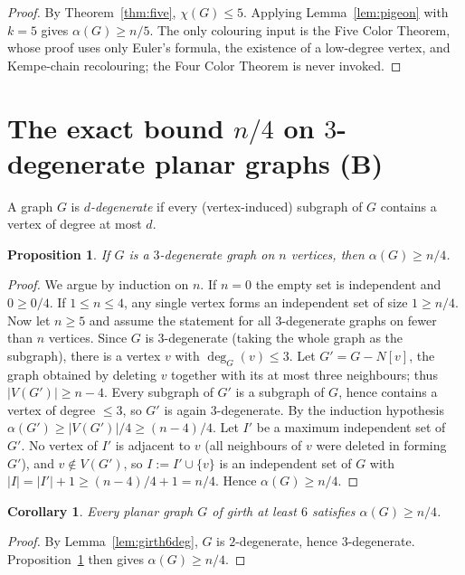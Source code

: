 \documentclass{amsart}
\newtheorem{corollary}{Corollary}
\newtheorem{proposition}{Proposition}
\theoremstyle{remark}
\begin{document}
\begin{proof}
By Theorem~\ref{thm:five}, $\chi(G)\le5$. Applying Lemma~\ref{lem:pigeon} with
$k=5$ gives $\alpha(G)\ge n/5$. The only colouring input is the Five Color
Theorem, whose proof uses only Euler's formula, the existence of a low-degree
vertex, and Kempe-chain recolouring; the Four Color Theorem is never invoked.
\end{proof}

\section{The exact bound \texorpdfstring{$n/4$}{n/4} on \texorpdfstring{$3$}{3}-degenerate
planar graphs (B)}\label{sec:3deg}

A graph $G$ is \emph{$d$-degenerate} if every (vertex-induced) subgraph of $G$
contains a vertex of degree at most $d$.

\begin{proposition}\label{prop:3deg}
If $G$ is a $3$-degenerate graph on $n$ vertices, then $\alpha(G)\ge n/4$.
\end{proposition}

\begin{proof}
We argue by induction on $n$. If $n=0$ the empty set is independent and
$0\ge 0/4$. If $1\le n\le4$, any single vertex forms an independent set of size
$1\ge n/4$. Now let $n\ge5$ and assume the statement for all $3$-degenerate
graphs on fewer than $n$ vertices. Since $G$ is $3$-degenerate (taking the whole
graph as the subgraph), there is a vertex $v$ with $\deg_G(v)\le3$. Let
$G'=G-N[v]$, the graph obtained by deleting $v$ together with its at most three
neighbours; thus $|V(G')|\ge n-4$. Every subgraph of $G'$ is a subgraph of $G$,
hence contains a vertex of degree $\le3$, so $G'$ is again $3$-degenerate. By the
induction hypothesis $\alpha(G')\ge |V(G')|/4\ge (n-4)/4$. Let $I'$ be a maximum
independent set of $G'$. No vertex of $I'$ is adjacent to $v$ (all neighbours of
$v$ were deleted in forming $G'$), and $v\notin V(G')$, so $I:=I'\cup\{v\}$ is an
independent set of $G$ with $|I|=|I'|+1\ge (n-4)/4+1 = n/4$. Hence
$\alpha(G)\ge n/4$.
\end{proof}

\begin{corollary}\label{cor:girth}
Every planar graph $G$ of girth at least $6$ satisfies $\alpha(G)\ge n/4$.
\end{corollary}

\begin{proof}
By Lemma~\ref{lem:girth6deg}, $G$ is $2$-degenerate, hence $3$-degenerate.
Proposition~\ref{prop:3deg} then gives $\alpha(G)\ge n/4$.
\end{proof}
\end{document}
